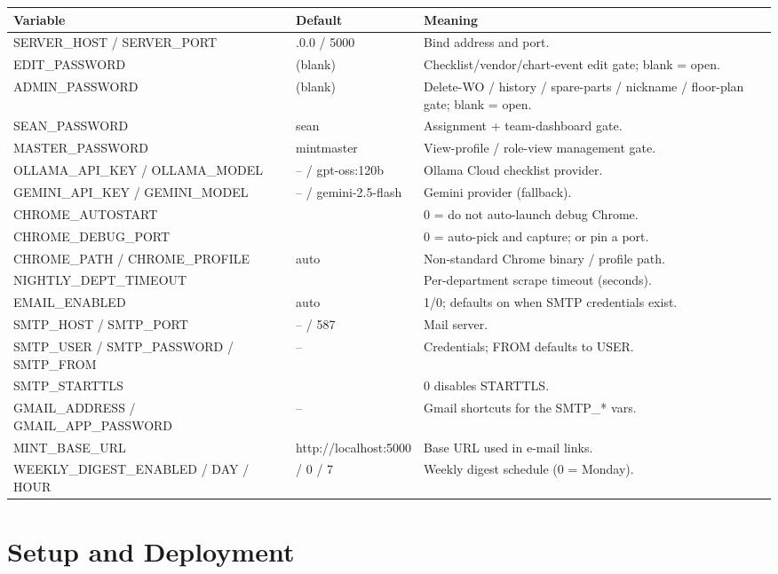 \documentclass[11pt,a4paper]{article}
\begin{document}
\begin{longtable}{@{}>{\ttfamily}p{}>{\ttfamily}p{}p{}@{}}
\toprule
\textbf{Variable} & \textbf{Default} & \textbf{Meaning} \\
\midrule
\endhead
SERVER\_HOST / SERVER\_PORT & 0.0.0.0 / 5000 & Bind address and port. \\
EDIT\_PASSWORD & (blank) & Checklist/vendor/chart-event edit gate; blank = open. \\
ADMIN\_PASSWORD & (blank) & Delete-WO / history / spare-parts / nickname / floor-plan gate; blank = open. \\
SEAN\_PASSWORD & sean & Assignment + team-dashboard gate. \\
MASTER\_PASSWORD & mintmaster & View-profile / role-view management gate. \\
OLLAMA\_API\_KEY / OLLAMA\_MODEL & -- / gpt-oss:120b & Ollama Cloud checklist provider. \\
GEMINI\_API\_KEY / GEMINI\_MODEL & -- / gemini-2.5-flash & Gemini provider (fallback). \\
CHROME\_AUTOSTART & 1 & 0 = do not auto-launch debug Chrome. \\
CHROME\_DEBUG\_PORT & 0 & 0 = auto-pick and capture; or pin a port. \\
CHROME\_PATH / CHROME\_PROFILE & auto & Non-standard Chrome binary / profile path. \\
NIGHTLY\_DEPT\_TIMEOUT & 14400 & Per-department scrape timeout (seconds). \\
EMAIL\_ENABLED & auto & 1/0; defaults on when SMTP credentials exist. \\
SMTP\_HOST / SMTP\_PORT & -- / 587 & Mail server. \\
SMTP\_USER / SMTP\_PASSWORD / SMTP\_FROM & -- & Credentials; FROM defaults to USER. \\
SMTP\_STARTTLS & 1 & 0 disables STARTTLS. \\
GMAIL\_ADDRESS / GMAIL\_APP\_PASSWORD & -- & Gmail shortcuts for the SMTP\_* vars. \\
MINT\_BASE\_URL & http://localhost:5000 & Base URL used in e-mail links. \\
WEEKLY\_DIGEST\_ENABLED / DAY / HOUR & 1 / 0 / 7 & Weekly digest schedule (0 = Monday). \\
\bottomrule
\end{longtable}

\section{Setup and Deployment}
\end{document}
